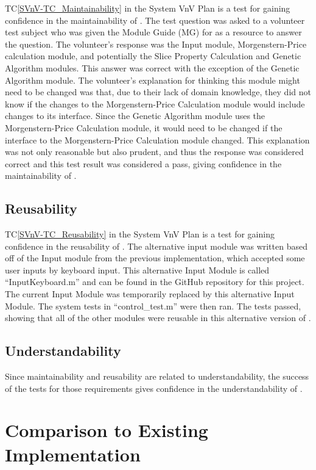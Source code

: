 \documentclass[12pt, titlepage]{article}
\newcommand{\tcref}[1]{TC\ref{#1}}
\begin{document}
\tcref{SVnV-TC_Maintainability} in the System VnV Plan is a test for gaining 
confidence in the maintainability of \progname{}. The test question was asked 
to a volunteer test subject who was given the Module Guide (MG) for \progname{} 
as a resource to answer the question. The volunteer's response was the Input 
module, Morgenstern-Price calculation module, and potentially the Slice 
Property Calculation and Genetic Algorithm modules. This answer was correct 
with the exception of the Genetic Algorithm module. The volunteer's explanation 
for thinking this module might need to be changed was that, due to their lack 
of domain knowledge, they did not know if the changes to the Morgenstern-Price 
Calculation module would include changes to its interface. Since the Genetic 
Algorithm module uses the Morgenstern-Price Calculation module, it would need 
to be changed if the interface to the Morgenstern-Price Calculation module 
changed. This explanation was not only reasonable but also prudent, and thus 
the response was considered correct and this test result was considered a pass, 
giving confidence in the maintainability of \progname{}.
		
\subsection{Reusability}

\tcref{SVnV-TC_Reusability} in the System VnV Plan is a test for gaining 
confidence in the reusability of \progname{}. The alternative input module was 
written based off of the Input module from the previous implementation, which 
accepted some user inputs by keyboard input. This alternative Input Module is 
called ``InputKeyboard.m'' and can be found in the GitHub repository for this 
project. The current Input Module was temporarily replaced by this alternative 
Input Module. The system tests in ``control\_test.m'' were then ran. The tests 
passed, showing that all of the other modules were reusable in this alternative 
version of \progname{}.

\subsection{Understandability}
Since maintainability and reusability are related to understandability, the 
success of the tests for those requirements gives confidence in the 
understandability of \progname{}.
	
\section{Comparison to Existing Implementation} \label{sec_Comparison}
\end{document}
